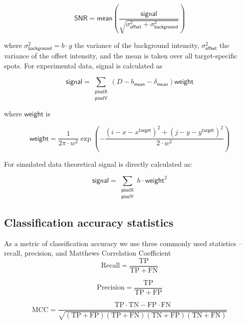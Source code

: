 \begin{equation}
    \mathsf{SNR} = \mathsf{mean} \left( \dfrac{\mathsf{signal}}{\sqrt{\sigma^2_{\mathsf{offset}} + \sigma^2_{\mathsf{background}}}} \right)
\end{equation}

where $\sigma^2_{\mathsf{background}} = b \cdot g$ the variance of the background intensity, $\sigma^2_{\mathsf{offset}}$ the variance of the offset intensity, and the mean is taken over all target-specific spots.  For experimental data, signal is calculated as

\begin{equation}
    \mathsf{signal} =  \sum_{\substack{\mathsf{pixelX} \\ \mathsf{pixelY}}} \left( D - b_{\mathsf{mean}} - \delta_\mathsf{mean} \right)  \mathsf{weight}
\end{equation}

where $\mathsf{weight}$ is

\begin{equation}
    \mathsf{weight} = \dfrac{1}{2 \pi \cdot w^2} \exp{\left( -\dfrac{(i-x-x^\mathsf{target})^2 + (j-y-y^\mathsf{target})^2}{2 \cdot w^2} \right)}
\end{equation}

For simulated data theoretical signal is directly calculated as:

\begin{equation}
    \mathsf{signal} =  \sum_{\substack{\mathsf{pixelX} \\ \mathsf{pixelY}}} h \cdot \mathsf{weight}^2
\end{equation}

\subsection*{Classification accuracy statistics}

As a metric of classification accuracy we use three commonly used statistics -- recall, precision, and Matthews Correlation Coefficient \cite{Matthews1975-rw}
\begin{equation}
    \mathrm{Recall} = \dfrac{\mathrm{TP}}{\mathrm{TP} + \mathrm{FN}}
\end{equation}

\begin{equation}
    \mathrm{Precision} = \dfrac{\mathrm{TP}}{\mathrm{TP} + \mathrm{FP}}
\end{equation}

\begin{equation}
    \mathrm{MCC} =
        \dfrac{\mathrm{TP} \cdot \mathrm{TN} - \mathrm{FP} \cdot \mathrm{FN}}
        {\sqrt{(\mathrm{TP} + \mathrm{FP}) (\mathrm{TP} + \mathrm{FN}) (\mathrm{TN} + \mathrm{FP}) (\mathrm{TN} + \mathrm{FN})}}
\end{equation}

